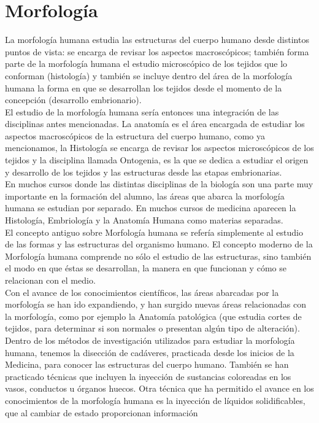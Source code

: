 \section{Morfología}
La morfología humana estudia las estructuras del cuerpo humano desde distintos puntos de vista: se encarga de revisar los aspectos macroscópicos; 
también forma parte de la morfología humana el estudio microscópico de los tejidos que lo conforman (histología) y también se incluye dentro del 
área de la morfología humana la forma en que se desarrollan los tejidos desde el momento de la concepción (desarrollo embrionario).\\
El estudio de la morfología humana sería entonces una integración de las disciplinas antes mencionadas. La anatomía es el área encargada de estudiar los 
aspectos macroscópicos de la estructura del cuerpo humano, como ya mencionamos, la Histología se encarga de revisar los aspectos microscópicos de los tejidos 
y la disciplina llamada Ontogenia, es la que se dedica a estudiar el origen y desarrollo de los tejidos y las estructuras desde las etapas embrionarias.\\
En muchos cursos donde las distintas disciplinas de la biología  son una parte muy importante en la formación del alumno, las áreas que abarca la morfología 
humana se estudian por separado. En muchos cursos de medicina aparecen la Histología, Embriología y la Anatomía Humana como materias separadas.\\
El concepto antiguo sobre Morfología humana se refería simplemente al estudio de las formas y  las estructuras del organismo humano. 
El concepto moderno de la Morfología humana comprende no sólo el estudio de las estructuras, sino también el modo en que éstas se desarrollan, 
la manera en que funcionan y cómo se relacionan con el medio.\\
Con el avance de los conocimientos científicos, las áreas abarcadas por la morfología se han ido expandiendo, y han surgido nuevas áreas relacionadas con la morfología, 
como por ejemplo la Anatomía patológica (que estudia cortes de tejidos, para determinar  si son normales o presentan algún tipo de alteración).\\
Dentro de los métodos de investigación utilizados para estudiar la morfología humana, tenemos la disección de cadáveres, practicada desde los inicios de la Medicina, 
para conocer las estructuras del cuerpo humano. También se han practicado técnicas que incluyen la inyección de sustancias coloreadas en los vasos, conductos u órganos huecos. 
Otra técnica que ha permitido el avance en los conocimientos de la morfología humana es la inyección de líquidos solidificables, que al cambiar de estado proporcionan información 
